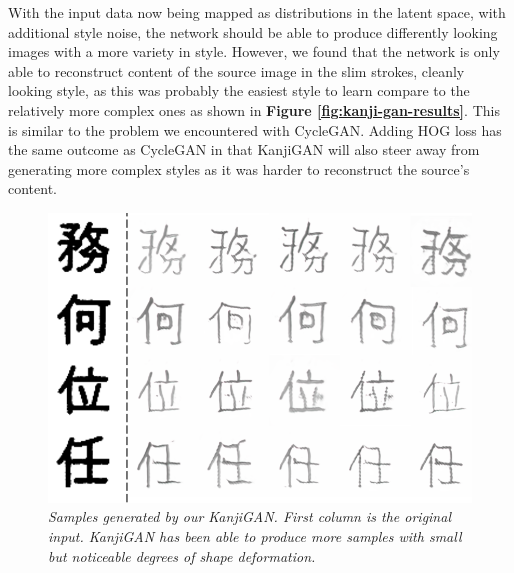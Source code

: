 \documentclass[12pt]{report}
\begin{document}
With the input data now being mapped as distributions in the latent space, with additional style noise, the network should be able to produce differently looking images with a more variety in style. However, we found that the network is only able to reconstruct content of the source image in the slim strokes, cleanly looking style, as this was probably the easiest style to learn compare to the relatively more complex ones as shown in \textbf{Figure \ref{fig:kanji-gan-results}}. This is similar to the problem we encountered with CycleGAN. Adding HOG loss has the same outcome as CycleGAN in that KanjiGAN will also steer away from generating more complex styles as it was harder to reconstruct the source's content. 

\begin{figure}[H]
	\centering
	\includegraphics[scale=0.8]{kanji-gan-results-2}
	\caption{\textit{Samples generated by our KanjiGAN. First column is the original input. KanjiGAN has been able to produce more samples with small but noticeable degrees of shape deformation.}}
	\label{fig:kanji-gan-results-2}
\end{figure}
\end{document}
